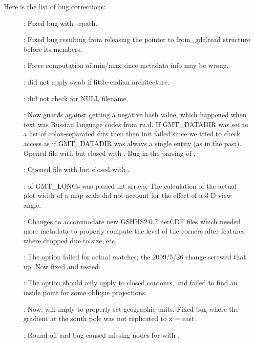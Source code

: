 Here is the list of bug corrections:
\begin{description}
	\item []:	Fixed bug with --rpath.
	\item []:	Fixed bug resulting from releasing the pointer to from\_gdalread
		structure before its members.
	\item []:	Force computation of min/max since metadata info may be wrong.
	\item []:	 did not apply swab if little-endian architecture.
	\item []:	 did not check for NULL filename.
	\item []:	Now guards against getting a negative hash value, which happened
		when text was Russian language codes from ru.d.  If GMT\_DATADIR was set to a list of colon-separated dirs
		then then init failed since we tried to check access as
		if GMT\_DATADIR was always a single entity (as in the past). Opened file with  but closed with .
		Bug in the parsing of .
	\item []:	Opened file with  but closed with .
	\item []:	 of GMT\_LONGs was passed int arrays.  The calculation
		of the actual plot width of a map scale did not account for the effect of a 3-D view angle.
	\item []:		Changes to accommodate new GSHHS2.0.2 netCDF files
		which needed more metadata to properly compute the
		level of tile corners after features where dropped
		due to size, etc.
	\item []:	The  option failed for actual matches; the 2009/5/26
		change screwed that up.  Now fixed and tested.
	\item []:	The  option should only apply to closed contours, and
		 failed to find an inside point for some oblique projections.
	\item []:	Now,  will imply  to properly set geographic units.
		Fixed bug where the gradient at the south pole was not replicated to x = east.
	\item []:	Round-off and bug caused missing nodes for  with .

\end{description}

